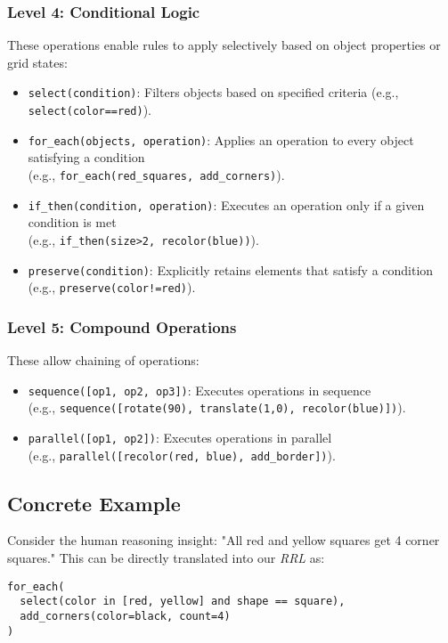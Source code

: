 \documentclass[12pt]{article}
\newcommand{\rrl}{\textit{RRL}}
\begin{document}
\subsubsection{Level 4: Conditional Logic}
These operations enable rules to apply selectively based on object properties or grid states:
\begin{itemize}[noitemsep,topsep=0pt]
  \item \texttt{select(condition)}: Filters objects based on specified criteria (e.g., \texttt{select(color==red)}).
  \item \texttt{for\_each(objects, operation)}: Applies an operation to every object satisfying a condition \\(e.g., \texttt{for\_each(red\_squares, add\_corners)}).
  \item \texttt{if\_then(condition, operation)}: Executes an operation only if a given condition is met \\(e.g., \texttt{if\_then(size>2, recolor(blue))}).
  \item \texttt{preserve(condition)}: Explicitly retains elements that satisfy a condition \\(e.g., \texttt{preserve(color!=red)}).
\end{itemize}

\subsubsection{Level 5: Compound Operations}
These allow chaining of operations:
\begin{itemize}[noitemsep,topsep=0pt]
  \item \texttt{sequence([op1, op2, op3])}: Executes operations in sequence \\(e.g., \texttt{sequence([rotate(90), translate(1,0), recolor(blue)])}).
  \item \texttt{parallel([op1, op2])}: Executes operations in parallel \\(e.g., \texttt{parallel([recolor(red, blue), add\_border])}).
\end{itemize}

\subsection{Concrete Example}
Consider the human reasoning insight: "All red and yellow squares get 4 corner squares." This can be directly translated into our \rrl{} as:
\begin{verbatim}
for_each(
  select(color in [red, yellow] and shape == square),
  add_corners(color=black, count=4)
)
\end{verbatim}
\end{document}
